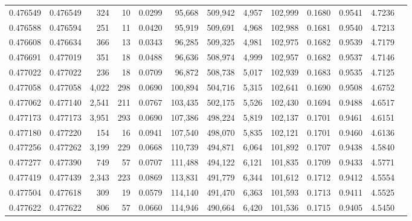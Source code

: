 \begin{tabular}{rrrrrrrrrrrrr}
0.476549 & 0.476549 &   324 &    10 &                                     0.0299 &  95,668 & 509,942 &   4,957 & 102,999 & 0.1680 & 0.9541 & 4.7236 \\
0.476588 & 0.476594 &   251 &    11 &                                     0.0420 &  95,919 & 509,691 &   4,968 & 102,988 & 0.1681 & 0.9540 & 4.7213 \\
0.476608 & 0.476634 &   366 &    13 &                                     0.0343 &  96,285 & 509,325 &   4,981 & 102,975 & 0.1682 & 0.9539 & 4.7179 \\
0.476691 & 0.477019 &   351 &    18 &                                     0.0488 &  96,636 & 508,974 &   4,999 & 102,957 & 0.1682 & 0.9537 & 4.7146 \\
0.477022 & 0.477022 &   236 &    18 &                                     0.0709 &  96,872 & 508,738 &   5,017 & 102,939 & 0.1683 & 0.9535 & 4.7125 \\
0.477058 & 0.477058 & 4,022 &   298 &                                     0.0690 & 100,894 & 504,716 &   5,315 & 102,641 & 0.1690 & 0.9508 & 4.6752 \\
0.477062 & 0.477140 & 2,541 &   211 &                                     0.0767 & 103,435 & 502,175 &   5,526 & 102,430 & 0.1694 & 0.9488 & 4.6517 \\
0.477173 & 0.477173 & 3,951 &   293 &                                     0.0690 & 107,386 & 498,224 &   5,819 & 102,137 & 0.1701 & 0.9461 & 4.6151 \\
0.477180 & 0.477220 &   154 &    16 &                                     0.0941 & 107,540 & 498,070 &   5,835 & 102,121 & 0.1701 & 0.9460 & 4.6136 \\
0.477256 & 0.477262 & 3,199 &   229 &                                     0.0668 & 110,739 & 494,871 &   6,064 & 101,892 & 0.1707 & 0.9438 & 4.5840 \\
0.477277 & 0.477390 &   749 &    57 &                                     0.0707 & 111,488 & 494,122 &   6,121 & 101,835 & 0.1709 & 0.9433 & 4.5771 \\
0.477419 & 0.477439 & 2,343 &   223 &                                     0.0869 & 113,831 & 491,779 &   6,344 & 101,612 & 0.1712 & 0.9412 & 4.5554 \\
0.477504 & 0.477618 &   309 &    19 &                                     0.0579 & 114,140 & 491,470 &   6,363 & 101,593 & 0.1713 & 0.9411 & 4.5525 \\
0.477622 & 0.477622 &   806 &    57 &                                     0.0660 & 114,946 & 490,664 &   6,420 & 101,536 & 0.1715 & 0.9405 & 4.5450 \\

\end{tabular}
